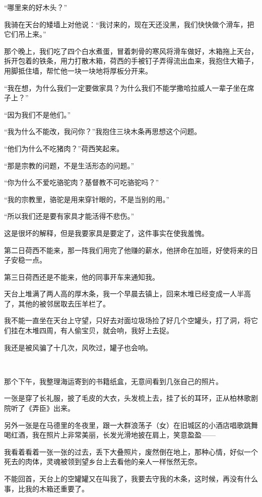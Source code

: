 \par “哪里来的好木头？”
\par 我骑在天台的矮墙上对他说：“我讨来的，现在天还没黑，我们快快做个滑车，把它们吊上来。”
\par 那个晚上，我们吃了四个白水煮蛋，冒着刺骨的寒风将滑车做好，木箱拖上天台，拆开包着的铁条，用力打散木箱，荷西的手被钉子弄得流出血来，我抱住大箱子，用脚抵住墙，帮忙他一块一块地将厚板分开来。
\par “我在想，为什么我们一定要做家具？为什么我们不能学撒哈拉威人一辈子坐在席子上？”
\par “因为我们不是他们。”
\par “我为什么不能改，我问你？”我抱住三块木条再思想这个问题。
\par “他们为什么不吃猪肉？”荷西笑起来。
\par “那是宗教的问题，不是生活形态的问题。”
\par “你为什么不爱吃骆驼肉？基督教不可吃骆驼吗？”
\par “我的宗教里，骆驼是用来穿针眼的，不是当别的用。”
\par “所以我们还是要有家具才能活得不悲伤。”
\par 这是很坏的解释，但是我要家具是要定了，这件事实在使我羞愧。
\par 第二日荷西不能来，那一阵我们用完了他赚的薪水，他拼命在加班，好使将来的日子安稳一点。
\par 第三日荷西还是不能来，他的同事开车来通知我。
\par 天台上堆满了两人高的厚木条，我一个早晨去镇上，回来木堆已经变成一人半高了，其他的被邻居取去压羊栏了。
\par 我不能一直坐在天台上守望，只好去对面垃圾场捡了好几个空罐头，打了洞，将它们挂在木堆四周，有人偷宝贝，就会响，我好上去捉。
\par 我还是被风骗了十几次，风吹过，罐子也会响。
\par  
\par 那个下午，我整理海运寄到的书籍纸盒，无意间看到几张自己的照片。
\par 一张是穿了长礼服，披了毛皮的大衣，头发梳上去，挂了长的耳环，正从柏林歌剧院听了《弄臣》出来。
\par 另外一张是在马德里的冬夜里，跟一大群浪荡子（女）在旧城区的小酒店唱歌跳舞喝红酒，我在照片上非常美丽，长发光滑地披在肩上，笑意盈盈——
\par 我看着看着一张一张的过去，丢下大叠照片，废然倒在地上，那种心情，好似一个死去的肉体，灵魂被领到望乡台上去看他的亲人一样怅然无奈。
\par 不能回首，天台上的空罐罐又在叫我了，我要去守我的木条，这时候，再没有什么事，比我的木箱还重要了。
